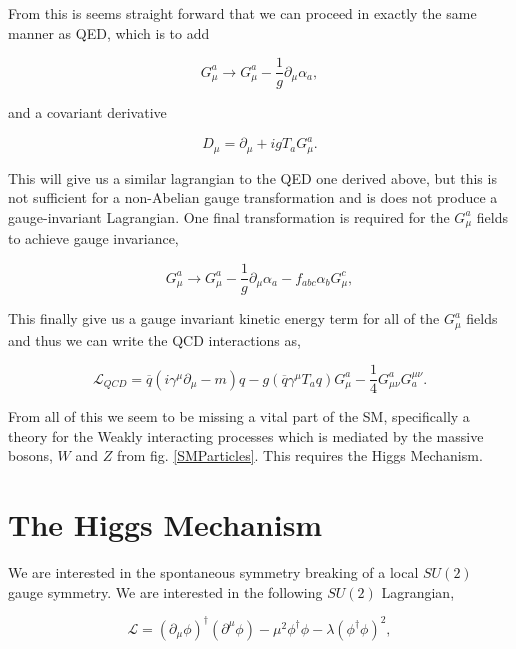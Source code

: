 From this is seems straight forward that we can proceed in exactly the same manner as QED, which is to add

\begin{equation}
G_\mu^a\rightarrow G_\mu^a-\frac{1}{g}\partial_\mu\alpha_a, 
\end{equation}

and a covariant derivative

\begin{equation}
D_\mu=\partial_\mu+igT_aG_\mu^a.
\end{equation}

This will give us a similar lagrangian to the QED one derived above, but this is not sufficient for a non-Abelian gauge transformation and is does not produce a gauge-invariant Lagrangian. One final transformation is required for the $G_\mu^a$ fields to achieve gauge invariance, 

\begin{equation}\label{QCDGaugeTransform}
G_\mu^a\rightarrow G_\mu^a-\frac{1}{g}\partial_\mu\alpha_a-f_{abc}\alpha_b G_\mu^c,
\end{equation}

This finally give us a gauge invariant kinetic energy term for all of the $G_\mu^a$ fields and thus we can write the QCD interactions as,

\begin{equation}\label{LagrangianQCD}
\mathcal{L}_{QCD}=\overline{q}(i\gamma^\mu\partial_\mu-m)q-g(\overline{q}\gamma^\mu T_a q)G^a_\mu-\frac{1}{4}G^a_{\mu\nu}G_a^{\mu\nu}.
\end{equation}

From all of this we seem to be missing a vital part of the SM, specifically a theory for the Weakly interacting processes which is mediated by the massive bosons, $W$ and $Z$ from fig. \ref{SMParticles}. This requires the Higgs Mechanism.

\section{The Higgs Mechanism}

We are interested in the spontaneous symmetry breaking of a local $SU(2)$ gauge symmetry. We are interested in the following $SU(2)$ Lagrangian,

\begin{equation}\label{HiggsLagrangian}
\mathcal{L}=(\partial_\mu\phi)^\dagger(\partial^\mu\phi)-\mu^2\phi^\dagger\phi-\lambda(\phi^\dagger\phi)^2,
\end{equation}

